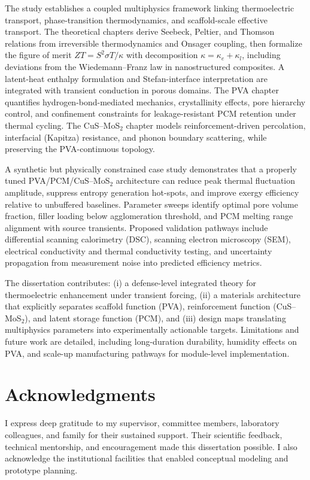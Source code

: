 \documentclass[12pt,a4paper]{report}
\begin{document}
The study establishes a coupled multiphysics framework linking thermoelectric transport, phase-transition thermodynamics, and scaffold-scale effective transport. The theoretical chapters derive Seebeck, Peltier, and Thomson relations from irreversible thermodynamics and Onsager coupling, then formalize the figure of merit $ZT = S^2\sigma T/\kappa$ with decomposition $\kappa=\kappa_e+\kappa_l$, including deviations from the Wiedemann--Franz law in nanostructured composites. A latent-heat enthalpy formulation and Stefan-interface interpretation are integrated with transient conduction in porous domains. The PVA chapter quantifies hydrogen-bond-mediated mechanics, crystallinity effects, pore hierarchy control, and confinement constraints for leakage-resistant PCM retention under thermal cycling. The CuS--MoS$_2$ chapter models reinforcement-driven percolation, interfacial (Kapitza) resistance, and phonon boundary scattering, while preserving the PVA-continuous topology.

A synthetic but physically constrained case study demonstrates that a properly tuned PVA/PCM/CuS--MoS$_2$ architecture can reduce peak thermal fluctuation amplitude, suppress entropy generation hot-spots, and improve exergy efficiency relative to unbuffered baselines. Parameter sweeps identify optimal pore volume fraction, filler loading below agglomeration threshold, and PCM melting range alignment with source transients. Proposed validation pathways include differential scanning calorimetry (DSC), scanning electron microscopy (SEM), electrical conductivity and thermal conductivity testing, and uncertainty propagation from measurement noise into predicted efficiency metrics.

The dissertation contributes: (i) a defense-level integrated theory for thermoelectric enhancement under transient forcing, (ii) a materials architecture that explicitly separates scaffold function (PVA), reinforcement function (CuS--MoS$_2$), and latent storage function (PCM), and (iii) design maps translating multiphysics parameters into experimentally actionable targets. Limitations and future work are detailed, including long-duration durability, humidity effects on PVA, and scale-up manufacturing pathways for module-level implementation.

\chapter*{Acknowledgments}
I express deep gratitude to my supervisor, committee members, laboratory colleagues, and family for their sustained support. Their scientific feedback, technical mentorship, and encouragement made this dissertation possible. I also acknowledge the institutional facilities that enabled conceptual modeling and prototype planning.
\end{document}
